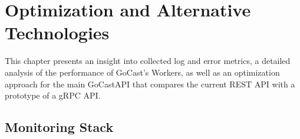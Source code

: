 
\chapter{Optimization and Alternative Technologies}\label{chapter:optimization_and_alternative_technologies}

This chapter presents an insight into collected log and error metrics, a detailed analysis of the performance of GoCast's Workers, as well as an optimization approach for the main GoCast\ac{API} that compares the current REST \ac{API} with a prototype of a gRPC \ac{API}.   

\section{Monitoring Stack}

